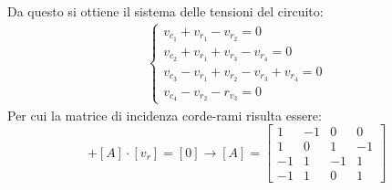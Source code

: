 \documentclass{article}
\numberwithin{equation}{subsection}
\begin{document}
Da questo si ottiene il sistema delle tensioni del circuito: 
\begin{gather*}
    \begin{cases}
        v_{c_1}+v_{r_1}-v_{r_2}=0\\
        v_{c_2}+v_{r_1}+v_{r_3}-v_{r_4}=0\\
        v_{c_3}-v_{r_1}+v_{r_2}-v_{r_3}+v_{r_4}=0\\
        v_{c_4}-v_{r_2}-r_{v_3}=0
    \end{cases}
\end{gather*}
Per cui la matrice di incidenza corde-rami risulta essere:
\begin{equation*}
    [v_c]+[A]\cdot[v_r]=[0]\to [A]=\begin{bmatrix}
        1&-1&0&0\\
        1&0&1&-1\\
        -1&1&-1&1\\
        -1&1&0&1
    \end{bmatrix}
\end{equation*}
\end{document}

